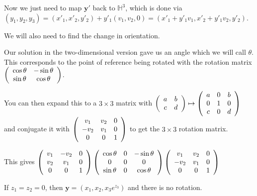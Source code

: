 Now we just need to map $\textbf{y}'$ back to $\mathbb{H}^3$, which is done via $(y_1,y_2,y_3) = (x'_1,x'_2,y'_2)+y'_1(v_1,v_2,0) = (x'_1+y'_1v_1,x'_2+y'_1v_2,y'_2)$.

We will also need to find the change in orientation.

Our solution in the two-dimensional version gave us an angle which we will call $\theta$. This corresponds to the point of reference being rotated with the rotation matrix $\left(\begin{array}{ccc} \cos\theta & -\sin\theta \\\sin\theta & \cos\theta \end{array} \right)$.

You can then expand this to a $3 \times 3$ matrix with $\left(\begin{array}{ccc} a & b \\c & d \end{array} \right) \mapsto \left(\begin{array}{ccc} a & 0 & b \\0 & 1 & 0 \\c & 0 & d \end{array} \right)$ and conjugate it with $\left(\begin{array}{ccc} v_1 & v_2 & 0 \\-v_2 & v_1 & 0 \\0 & 0 & 1 \end{array} \right)$ to get the $3 \times 3$ rotation matrix.

This gives $\left(\begin{array}{ccc} v_1 & -v_2 & 0 \\v_2 & v_1 & 0 \\0 & 0 & 1 \end{array} \right) \left(\begin{array}{ccc} \cos\theta & 0 & -\sin\theta \\0 & 0 & 0 \\\sin\theta & 0 & \cos\theta \end{array} \right) \left(\begin{array}{ccc} v_1 & v_2 & 0 \\-v_2 & v_1 & 0 \\0 & 0 & 1 \end{array} \right)$


If $z_1 = z_2 = 0$, then $\textbf{y} = (x_1,x_2,x_3 e^{z_3})$ and there is no rotation.
